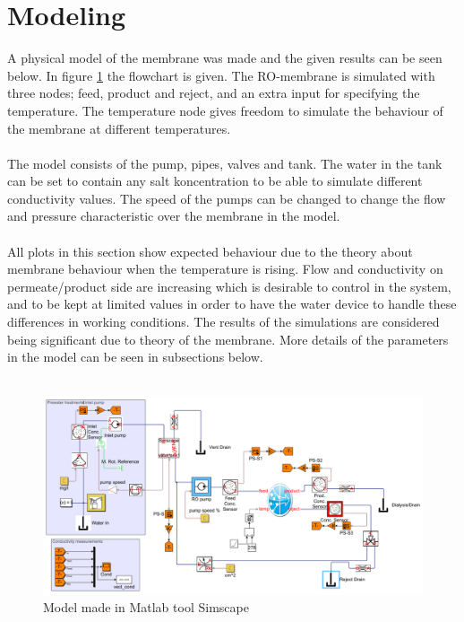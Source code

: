 \section{Modeling}
\label{sec:modres}
A physical model of the membrane was made and the given results can be seen below. In figure \ref{fig:simscape} the flowchart is given. The RO-membrane is simulated with three nodes; feed, product and reject, and an extra input for specifying the temperature. The temperature node gives freedom to simulate the behaviour of the membrane at different temperatures. \\
\\
The model consists of the pump, pipes, valves and tank. The water in the tank can be set to contain any salt koncentration to be able to simulate different conductivity values. The speed of the pumps can be changed to change the flow and pressure characteristic over the membrane in the model. \\
\\
All plots in this section show expected behaviour due to the theory about membrane behaviour when the temperature is rising. Flow and conductivity on permeate/product side are increasing which is desirable to control in the system, and to be kept at limited values in order to have the water device to handle these differences in working conditions. The results of the simulations are considered being significant due to theory of the membrane. More details of the parameters in the model can be  seen in subsections below.\\
\\
\begin{figure}[h]
\label{fig:simscape}
\centering
\includegraphics[width=\textwidth]{simscape_fc1.PNG}
\caption{Model made in Matlab tool Simscape }
\end{figure}
\newpage


